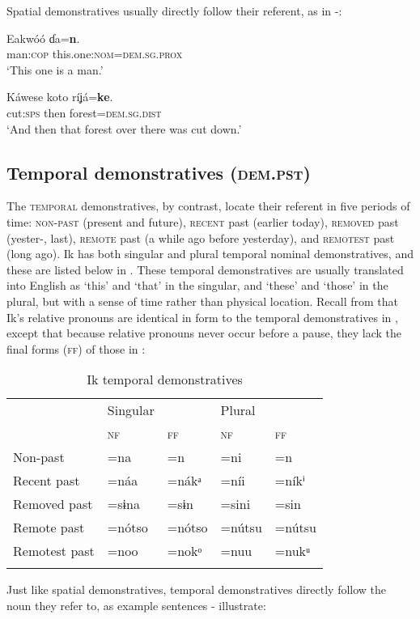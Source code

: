 Spatial demonstratives usually directly follow their referent, as in -:




\ea\label{ex:dem:1}
\gll Eakwóó   ɗa=\textbf{n}. \\
man:\textsc{cop}  this.one:\textsc{nom}=\textsc{dem.sg.prox}    \\
\glt ‘This one is a man.’ 
\z




\ea\label{ex:dem:2}
\gll Káwese   koto   ríʝá=\textbf{ke}. \\
cut:\textsc{sps}   then   forest=\textsc{dem.sg.dist}    \\
\glt ‘And then that forest over there was cut down.’ 
\z






\subsection{Temporal demonstratives (\textsc{dem.pst})}\label{sec:6.3}


The \textsc{temporal} demonstratives, by contrast, locate their referent in five periods of time: \textsc{non-past} (present and future), \textsc{recent} past (earlier today), \textsc{removed} past (yester-, last), \textsc{remote} past (a while ago before yesterday), and \textsc{remotest} past (long ago). Ik has both singular and plural temporal nominal demonstratives, and these are listed below in . These temporal demonstratives are usually translated into English as ‘this’ and ‘that’ in the singular, and ‘these’ and ‘those’ in the plural, but with a sense of time rather than physical location. Recall from  that Ik’s relative pronouns are identical in form to the temporal demonstratives in , except that because relative pronouns never occur before a pause, they lack the final forms (\textsc{ff}) of those in :


\begin{table}
\caption{Ik temporal demonstratives}
\label{tab:dem:temp}


\begin{tabularx}{\textwidth}{lXXXX}
\lsptoprule

& Singular &  & Plural & \\
& \textsc{nf} & \textsc{ff} & \textsc{nf} & \textsc{ff}\\
\midrule
Non-past & =na & =n & =ni & =n\\
Recent past & =náa & =nákᵃ & =níi & =níkⁱ\\
Removed past & =sɨna & =sɨn & =sini & =sin\\
Remote past & =nótso & =nótso & =nútsu & =nútsu\\
Remotest past & =noo & =nokᵒ & =nuu & =nukᵘ\\
\lspbottomrule
\end{tabularx}
\end{table}
Just like spatial demonstratives, temporal demonstratives directly follow the noun they refer to, as example sentences - illustrate:




